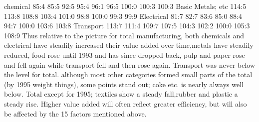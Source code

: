 chemical 85:4 85:5 92:5 95:4 96:1 96:5 100:0 100:3 100:3
Basic Metals; etc 114:5 113:8 108:8 103:4 101:0 98:8 100:0 99:3 99:9
Electrical 81:7 82:7 83:6 85:0 88:4 94:7 100:0 103:6 103:8
Transport 113:7 111:4 109:7 107:5 104:3 102:2 100:0 105:3 108:9
Thus relative to the picture for total manufacturing, both chemicals and electrical have
steadily increased their value added over time,metals have steadily reduced, food rose
until 1993 and has since dropped back, pulp and paper rose and fell again while transport
fell and then rose again.
Transport was never below the level for total.
although most other categories formed small parts of the total (by 1995 weight things),
some points stand out; coke etc. is nearly always well below. Total except for 1995;
textiles show a steady fall,rubber and plastic a steady rise.
Higher value added will often reflect greater efficiency, but will also be affected by the
15
factors mentioned above.
